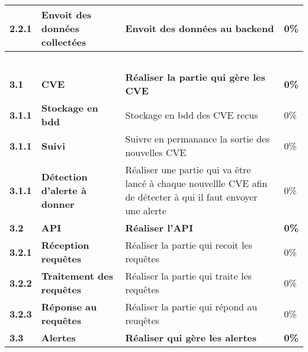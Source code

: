 \begin{supertabular}{|p{1.5cm} p{6cm}|p{5cm}|R{2cm}|}
  \hspace{6pt}
  \textbf{2.2.1}  & \textbf{Envoit des données collectées} & Envoit des données au backend & 0\% \\
  \hline


  \textcolor{white}{\textbf{3}}  & \textcolor{white}{\textbf{Backend}} & \textcolor{white}{\textbf{Réaliser un backend}} & \textcolor{white}{\textbf{0\%}} \\
  \hline

  \textbf{3.1}  & \textbf{CVE} & \textbf{Réaliser la partie qui gère les CVE} & \textbf{0\%} \\
  \hline

  \hspace{6pt}
  \textbf{3.1.1}  & \textbf{Stockage en bdd} & Stockage en bdd des CVE recus & 0\% \\
  \hline

  \hspace{6pt}
  \textbf{3.1.1}  & \textbf{Suivi} & Suivre en permanance la sortie des nouvelles CVE  & 0\% \\
  \hline

  \hspace{6pt}
  \textbf{3.1.1}  & \textbf{Détection d'alerte à donner} & Réaliser une partie qui va être lancé à chaque nouvellle CVE afin de détecter à qui il faut envoyer une alerte & 0\% \\
  \hline


  \textbf{3.2}  & \textbf{API} & \textbf{Réaliser l'API} & \textbf{0\%} \\
  \hline

  \hspace{6pt}
  \textbf{3.2.1}  & \textbf{Réception requêtes} & Réaliser la partie qui recoit les requêtes & 0\% \\
  \hline

  \hspace{6pt}
  \textbf{3.2.2}  & \textbf{Traitement des requêtes} & Réaliser la partie qui traite les requêtes  & 0\% \\
  \hline

  \hspace{6pt}
  \textbf{3.2.3}  & \textbf{Réponse au requêtes} & Réaliser la partie qui répond au reuqêtes & 0\% \\
  \hline


  \textbf{3.3}  & \textbf{Alertes} & \textbf{Réaliser qui gère les alertes} & \textbf{0\%} \\
  \hline


\end{supertabular}
